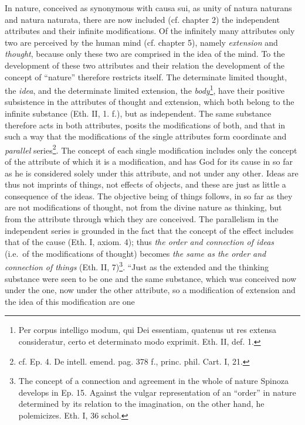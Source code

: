 \documentclass[12pt,a4paper,openany]{book}
\newcommand{\opage}[1]{\marginnote{\footnotesize\textit{[#1]}}}
\begin{document}
In nature, conceived as synonymous with causa sui, as unity of
natura naturans and natura naturata, there are now included (cf. chapter 2)
the independent attributes and their infinite modifications. Of
the infinitely many attributes only two are perceived by the human
mind (cf. chapter 5), namely \emph{extension} and \emph{thought}, because only
these two are comprised in the idea of the mind. To the development of these two
attributes and their relation the development of the concept of
``nature'' therefore restricts itself. The determinate limited thought, the \emph{idea}, and
the determinate limited extension, the \emph{body}\footnote{Per corpus
intelligo modum, qui Dei essentiam, quatenus ut res extensa
consideratur, certo et determinato modo exprimit. Eth. II, def.
1.}, have their positive subsistence in the attributes of thought and extension,
which both belong to the infinite substance (Eth. II,
1. f.), but as independent. The same substance therefore acts in
both attributes, posits the modifications of both, and that in such a way
that the modifications of the
\opage{73}\setcounter{footnote}{0}single attributes form coordinate and \emph{parallel}
series\footnote{cf. Ep. 4. De intell. emend. pag. 378 f., princ.
phil. Cart. I, 21.}. The concept of each single modification includes
only the concept of the attribute of which it is a modification, and has God
for its cause in so far as he is considered solely under this attribute,
and not under any other. Ideas are thus not imprints of
things, not effects of objects, and these are
just as little a consequence of the ideas. The objective being of things follows,
in so far as they are not modifications of thought, not from the
divine nature as thinking, but from the attribute through which
they are conceived. The parallelism in the independent series is grounded
in the fact that the concept of the effect includes that of the cause (Eth. I, axiom.
4); thus \emph{the order and connection of ideas} (i.e.\ of the
modifications of thought) becomes \emph{the same as the order and
connection of things} (Eth. II, 7)\footnote{The concept of a
connection and agreement in the whole of nature Spinoza develops in
Ep. 15. Against the vulgar representation of an ``order'' in nature
determined by its relation to the imagination, on the other hand, he
polemicizes. Eth. I, 36 schol.}. ``Just as the extended and the
thinking substance were seen to be one and the same substance, which
was conceived now under the one, now under the other attribute, so
a modification of extension and the idea of this modification are one
\end{document}
